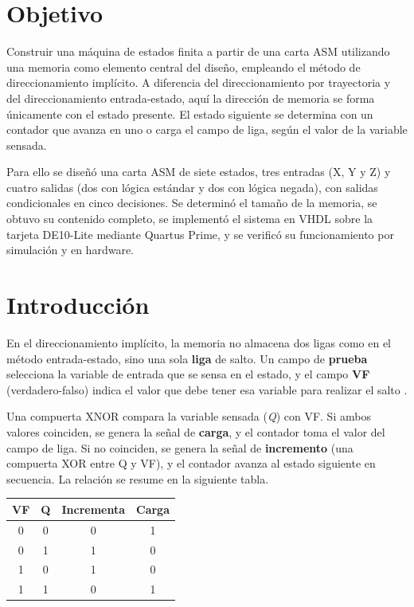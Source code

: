 \section{Objetivo}

Construir una máquina de estados finita a partir de una carta ASM utilizando una memoria
como elemento central del diseño, empleando el método de direccionamiento implícito. A
diferencia del direccionamiento por trayectoria y del direccionamiento entrada-estado, aquí la
dirección de memoria se forma únicamente con el estado presente. El estado siguiente se
determina con un contador que avanza en uno o carga el campo de liga, según el valor de la
variable sensada.

Para ello se diseñó una carta ASM de siete estados, tres entradas (X, Y y Z) y cuatro salidas
(dos con lógica estándar y dos con lógica negada), con salidas condicionales en cinco
decisiones. Se determinó el tamaño de la memoria, se obtuvo su contenido completo, se
implementó el sistema en VHDL sobre la tarjeta DE10-Lite mediante Quartus Prime, y se verificó
su funcionamiento por simulación y en hardware.

\section{Introducción}

En el direccionamiento implícito, la memoria no almacena dos ligas como en el método
entrada-estado, sino una sola \textbf{liga} de salto. Un campo de \textbf{prueba} selecciona
la variable de entrada que se sensa en el estado, y el campo \textbf{VF} (verdadero-falso)
indica el valor que debe tener esa variable para realizar el salto \cite{savage}.

Una compuerta XNOR compara la variable sensada (\textit{Q}) con VF. Si ambos valores coinciden,
se genera la señal de \textbf{carga}, y el contador toma el valor del campo de liga. Si no
coinciden, se genera la señal de \textbf{incremento} (una compuerta XOR entre Q y VF), y el
contador avanza al estado siguiente en secuencia. La relación se resume en la siguiente tabla.

\begin{center}
\begin{tabular}{@{}c c c c@{}}
\toprule
\textbf{VF} & \textbf{Q} & \textbf{Incrementa} & \textbf{Carga} \\
\midrule
0 & 0 & 0 & 1 \\
0 & 1 & 1 & 0 \\
1 & 0 & 1 & 0 \\
1 & 1 & 0 & 1 \\
\bottomrule
\end{tabular}
\end{center}

